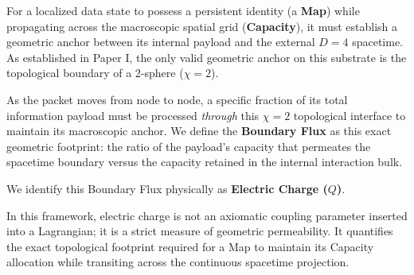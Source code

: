 For a localized data state to possess a persistent identity (a \textbf{Map}) while propagating across the macroscopic spatial grid (\textbf{Capacity}), it must establish a geometric anchor between its internal payload and the external $D=4$ spacetime. As established in Paper I, the only valid geometric anchor on this substrate is the topological boundary of a 2-sphere ($\chi=2$). 

As the packet moves from node to node, a specific fraction of its total information payload must be processed \textit{through} this $\chi=2$ topological interface to maintain its macroscopic anchor. We define the \textbf{Boundary Flux} as this exact geometric footprint: the ratio of the payload's capacity that permeates the spacetime boundary versus the capacity retained in the internal interaction bulk. 

We identify this Boundary Flux physically as \textbf{Electric Charge ($Q$)}. 

In this framework, electric charge is not an axiomatic coupling parameter inserted into a Lagrangian; it is a strict measure of geometric permeability. It quantifies the exact topological footprint required for a Map to maintain its Capacity allocation while transiting across the continuous spacetime projection.